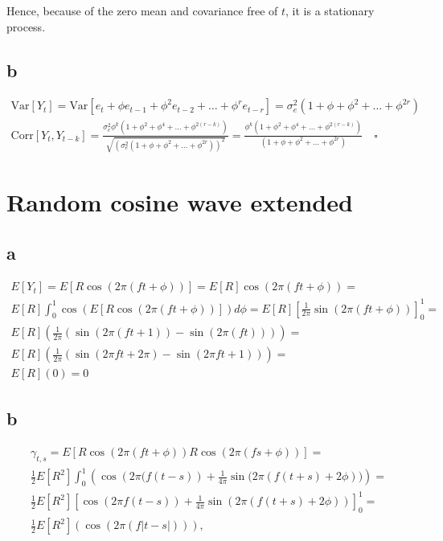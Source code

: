 \documentclass[]{book}
\theoremstyle{definition}
\theoremstyle{definition}
\theoremstyle{remark}
\begin{document}
Hence, because of the zero mean and covariance free of \(t\), it is a
stationary process.

\subsection*{b}\label{b-18}

\begin{gather*}
  \text{Var}[Y_t] = \text{Var}[e_t + \phi e_{t-1} + \phi^2 e_{t-2} + \dots + \phi^r e_{t-r}] = \sigma_e^2(1 + \phi + \phi^2 + \dots + \phi^{2r})\\
  \text{Corr}[Y_t, Y_{t-k}] = \frac{\sigma_e^2 \phi^k(1 + \phi^2 + \phi^4 + \dots + \phi^{2(r-k)})}{\sqrt{(\sigma_e^2(1 + \phi + \phi^2 + \dots + \phi^{2r}))^2}} = \frac{\phi^k(1 + \phi^2 + \phi^4 + \dots + \phi^{2(r-k)})}{(1 + \phi + \phi^2 + \dots + \phi^{2r})} \quad \square
\end{gather*}

\section{Random cosine wave extended}\label{random-cosine-wave-extended}

\subsection*{a}\label{a-19}

\begin{gather*}
  E[Y_t] = E[R \cos{(2\pi(ft+\phi))}] = E[R] \cos{(2\pi(ft+\phi))} = \\
  E[R] \int_0^1\cos(E[R \cos(2\pi(ft+\phi))])d\phi = E[R]\left[ \frac{1}{2\pi}\sin(2\pi(ft+\phi))\right]^1_0 = \\
  E[R] \left( \frac{1}{2\pi}(\sin(2\pi(ft+1)) - \sin(2\pi(ft))) \right) = \\
  E[R] \left( \frac{1}{2\pi}(\sin(2\pi ft + 2\pi) - \sin(2\pi ft + 1)) \right) = \\
  E[R] \left( 0 \right) = 0
\end{gather*}

\subsection*{b}\label{b-19}

\begin{gather*}
  \gamma_{t,s} = E[R \cos{(2\pi(ft+\phi))} R \cos{(2\pi(fs+\phi))}] = \\
  \frac{1}{2} E[R^2] \int_0^1\left(\cos{\left(2\pi(f(t-s)\right)} + \frac{1}{4\pi}\sin{(2\pi(f(t+s) + 2\phi)}) \right) =\\
  \frac{1}{2} E[R^2]\left[ \cos{(2\pi f(t-s))} + \frac{1}{4\pi}\sin{(2\pi(f(t+s) + 2\phi))} \right]^1_0 = \\
  \frac{1}{2} E[R^2]\left( \cos{(2\pi (f|t-s|))} \right),
\end{gather*}
\end{document}
